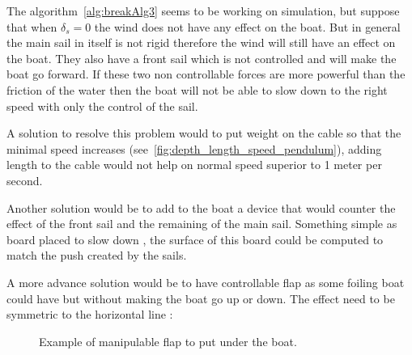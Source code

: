 The algorithm~\ref{alg:breakAlg3} seems to be working on simulation, but suppose that when $\delta_s = 0$ the wind does not have any effect on the boat. But in general the main sail in itself is not rigid therefore the wind will still have an effect on the boat. They also have a front sail which is not controlled and will make the boat go forward. If these two non controllable forces are more powerful than the friction of the water then the boat will not be able to slow down to the right speed with only the control of the sail.

A solution to resolve this problem would to put weight on the cable so that the minimal speed increases (see~\ref{fig:depth_length_speed_pendulum}), adding length to the cable would not help on normal speed superior to 1 meter per second.


Another solution would be to add to the boat a device that would counter the effect of the front sail and the remaining of the main sail. Something simple as board placed to slow down , the surface of this board could be computed to match the push created by the sails.
 
A more advance solution would be to have controllable flap as some foiling boat could have but without  making the boat go up or down. The effect need to be symmetric to the horizontal line :

\begin{figure}[H]
\centering
{} %
{

}
\caption*{Example of manipulable flap to put under the boat.}
\label{fig:model_boat_}
\end{figure}

